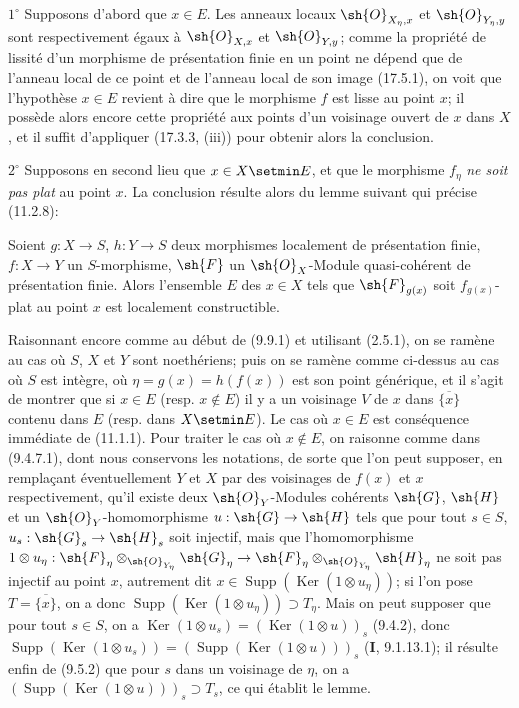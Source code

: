 $1^\circ$ Supposons d'abord que $x\in E$. Les anneaux locaux $\sh{O}_{X_\eta,x}$ et $\sh{O}_{Y_\eta,y}$ sont respectivement égaux à $\sh{O}_{X,x}$ et $\sh{O}_{Y,y}$; comme la propriété de lissité d'un morphisme de présentation finie en un point ne dépend que de l'anneau local de ce point et de l'anneau local de son image (17.5.1), on voit que l'hypothèse $x\in E$ revient à dire que le morphisme $f$ est lisse au point $x$; il possède alors encore cette propriété aux points d'un voisinage ouvert de $x$ dans $X$, et il suffit d'appliquer (17.3.3, (iii)) pour obtenir alors la conclusion.

$2^\circ$ Supposons en second lieu que $x\in X\setmin E$, et que le morphisme $f_\eta$ \emph{ne soit pas plat} au point $x$. La conclusion résulte alors du lemme suivant qui précise (11.2.8):

\begin{lemma}[17.7.11.1]
\label{IV.17.7.11.1}
Soient $g:X\to S$, $h:Y\to S$ deux morphismes localement de présentation finie, $f:X\to Y$ un $S$-morphisme, $\sh{F}$ un $\sh{O}_X$-Module quasi-cohérent de présentation finie. Alors l'ensemble $E$ des $x\in X$ tels que $\sh{F}_{g(x)}$ soit $f_{g(x)}$-plat au point $x$ est localement constructible.
\end{lemma}

Raisonnant encore comme au début de (9.9.1) et utilisant (2.5.1), on se ramène au cas où $S$, $X$ et $Y$ sont noethériens; puis on se ramène comme ci-dessus au cas où $S$ est intègre, où $\eta=g(x)=h(f(x))$ est son point générique, et il s'agit de montrer que si $x\in E$ (resp. $x\notin E$) il y a un voisinage $V$ de $x$ dans $\overline{\{x\}}$ contenu dans $E$ (resp. dans $X\setmin E$). Le cas où $x\in E$ est conséquence immédiate de (11.1.1). Pour traiter le cas où $x\notin E$, on raisonne comme dans (9.4.7.1), dont nous conservons les notations, de sorte que l'on peut supposer, en remplaçant éventuellement $Y$ et $X$ par des voisinages de $f(x)$ et $x$ respectivement, qu'il existe deux $\sh{O}_Y$-Modules cohérents $\sh{G}$, $\sh{H}$ et un $\sh{O}_Y$-homomorphisme $u:\sh{G}\to\sh{H}$ tels que pour tout $s\in S$, $u_s:\sh{G}_s\to\sh{H}_s$ soit injectif, mais que l'homomorphisme $1\otimes u_\eta:\sh{F}_\eta\otimes_{\sh{O}_{Y_\eta}}\sh{G}_\eta\to\sh{F}_\eta\otimes_{\sh{O}_{Y_\eta}}\sh{H}_\eta$ ne soit pas injectif au point $x$, autrement dit $x\in\operatorname{Supp}(\operatorname{Ker}(1\otimes u_\eta))$; si l'on pose $T=\overline{\{x\}}$, on a donc $\operatorname{Supp}(\operatorname{Ker}(1\otimes u_\eta))\supset T_\eta$. Mais on peut supposer que pour tout $s\in S$, on a $\operatorname{Ker}(1\otimes u_s)=(\operatorname{Ker}(1\otimes u))_s$ (9.4.2), donc
$\operatorname{Supp}(\operatorname{Ker}(1\otimes u_s))=(\operatorname{Supp}(\operatorname{Ker}(1\otimes u)))_s$ (\textbf{I}, 9.1.13.1); il résulte enfin de (9.5.2) que pour $s$ dans un voisinage de $\eta$, on a $(\operatorname{Supp}(\operatorname{Ker}(1\otimes u)))_s\supset T_s$, ce qui établit le lemme.

